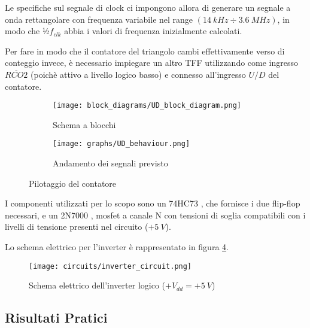 Le specifiche sul segnale di clock ci impongono allora di generare un segnale a onda rettangolare
con frequenza variabile nel range $(14\ kHz\div3.6\ MHz)$, in modo che ½$f_{clk}$ abbia
i valori di frequenza inizialmente calcolati.

Per fare in modo che il contatore del triangolo cambi effettivamente verso di conteggio invece,
è necessario impiegare un altro TFF utilizzando come ingresso $\overline{RCO2}$ (poichè
attivo a livello logico basso) e connesso all'ingresso $U/D$ del contatore.

\begin{figure}[H]
    \centering

    \begin{subfigure}{.5\textwidth}
        \centering
        \texttt{[image: block\_diagrams/UD\_block\_diagram.png]}
        \caption{Schema a blocchi}
        \label{UD_block_diagram}
    \end{subfigure}%
    \begin{subfigure}{.5\textwidth}
        \centering
        \texttt{[image: graphs/UD\_behaviour.png]}
        \caption{Andamento dei segnali previsto}
        \label{UD_behaviour}
    \end{subfigure}

    \caption{Pilotaggio del contatore}
\end{figure}

I componenti utilizzati per lo scopo sono un 74HC73 \cite{74hc73}, che fornisce i due
flip-flop necessari, e un 2N7000 \cite{2n7000}, mosfet a canale N con tensioni di soglia
compatibili con i livelli di tensione presenti nel circuito ($+5\ V$).

Lo schema elettrico per l'inverter è rappresentato in figura \ref{inverter_circuit}.

\begin{figure}[H]
    \centering
    \texttt{[image: circuits/inverter\_circuit.png]}
    \caption{Schema elettrico dell'inverter logico ($+V_{dd}=+5\ V$)}
    \label{inverter_circuit}
\end{figure}


\subsection*{Risultati Pratici}


